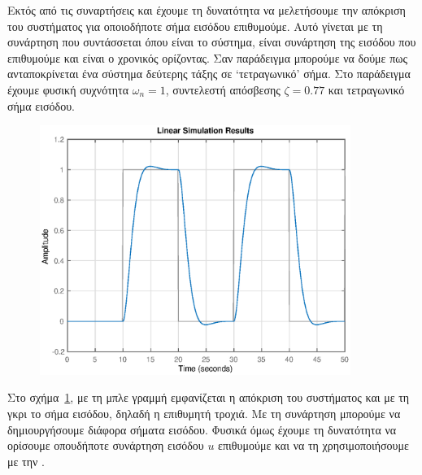 Εκτός από τις συναρτήσεις  και  έχουμε τη δυνατότητα να
μελετήσουμε την απόκριση του συστήματος για οποιοδήποτε σήμα εισόδου επιθυμούμε.
Αυτό γίνεται με τη συνάρτηση  που συντάσσεται
όπου  είναι το σύστημα,  είναι συνάρτηση της εισόδου που
επιθυμούμε και  είναι ο χρονικός ορίζοντας. Σαν παράδειγμα μπορούμε να
δούμε πως ανταποκρίνεται ένα σύστημα δεύτερης τάξης σε
\enquote*{τετραγωνικό} σήμα.
\eng{}
Στο παράδειγμα έχουμε φυσική συχνότητα \( \omega_n = 1 \), συντελεστή
απόσβεσης \( \zeta = 0.77 \) και τετραγωνικό σήμα εισόδου.
\begin{figure}[h!]
    \centering
    \includegraphics[width=0.9\textwidth]{figures/prelim7.eps}
    \caption{}
    \label{fig:prelim7}
\end{figure}
Στο σχήμα~\ref{fig:prelim7}, με τη μπλε γραμμή εμφανίζεται η απόκριση του
συστήματος και με τη γκρι το σήμα εισόδου, δηλαδή η επιθυμητή τροχιά. Με τη
συνάρτηση  μπορούμε να δημιουργήσουμε διάφορα σήματα εισόδου.
Φυσικά όμως έχουμε τη δυνατότητα να ορίσουμε οπουδήποτε συνάρτηση
εισόδου \( u \) επιθυμούμε και να τη χρησιμοποιήσουμε με την .

